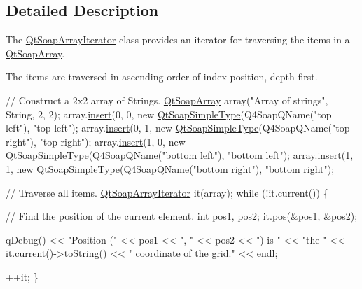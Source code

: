 \subsection{Detailed Description}
The \mbox{\hyperlink{class_qt_soap_array_iterator}{Qt\+Soap\+Array\+Iterator}} class provides an iterator for traversing the items in a \mbox{\hyperlink{class_qt_soap_array}{Qt\+Soap\+Array}}. 

The items are traversed in ascending order of index position, depth first.


\begin{DoxyCode}
\textcolor{comment}{// Construct a 2x2 array of Strings.}
\mbox{\hyperlink{class_qt_soap_array}{QtSoapArray}} array(\textcolor{stringliteral}{"Array of strings"}, String, 2, 2);
array.\mbox{\hyperlink{class_qt_soap_array_a7be8113dc4c686e1ea243b988269f50d}{insert}}(0, 0, \textcolor{keyword}{new} \mbox{\hyperlink{class_qt_soap_simple_type}{QtSoapSimpleType}}(Q4SoapQName(\textcolor{stringliteral}{"top left"}), \textcolor{stringliteral}{"top left"});
array.\mbox{\hyperlink{class_qt_soap_array_a7be8113dc4c686e1ea243b988269f50d}{insert}}(0, 1, \textcolor{keyword}{new} \mbox{\hyperlink{class_qt_soap_simple_type}{QtSoapSimpleType}}(Q4SoapQName(\textcolor{stringliteral}{"top right"}), \textcolor{stringliteral}{"top right"});
array.\mbox{\hyperlink{class_qt_soap_array_a7be8113dc4c686e1ea243b988269f50d}{insert}}(1, 0, \textcolor{keyword}{new} \mbox{\hyperlink{class_qt_soap_simple_type}{QtSoapSimpleType}}(Q4SoapQName(\textcolor{stringliteral}{"bottom left"}), \textcolor{stringliteral}{"bottom left"});
array.\mbox{\hyperlink{class_qt_soap_array_a7be8113dc4c686e1ea243b988269f50d}{insert}}(1, 1, \textcolor{keyword}{new} \mbox{\hyperlink{class_qt_soap_simple_type}{QtSoapSimpleType}}(Q4SoapQName(\textcolor{stringliteral}{"bottom right"}), \textcolor{stringliteral}{"bottom right"});

\textcolor{comment}{// Traverse all items.}
\mbox{\hyperlink{class_qt_soap_array_iterator}{QtSoapArrayIterator}} it(array);
\textcolor{keywordflow}{while} (!it.current()) \{

  \textcolor{comment}{// Find the position of the current element.}
  \textcolor{keywordtype}{int} pos1, pos2;
  it.pos(&pos1, &pos2);

  qDebug() << \textcolor{stringliteral}{"Position ("} << pos1 << \textcolor{stringliteral}{", "} << pos2 << \textcolor{stringliteral}{") is "}
           << \textcolor{stringliteral}{"the "} << it.current()->toString() << \textcolor{stringliteral}{" coordinate of the grid."} << endl;

  ++it;
\}
\end{DoxyCode}
 

